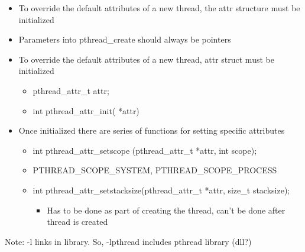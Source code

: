 \begin{itemize}
    \item To override the default attributes of a new thread, the attr structure must be initialized
    \item Parameters into pthread\_create should always be pointers
    \item To override the default attributes of a new thread, attr struct must be initialized
    \begin{itemize}
        \item pthread\_attr\_t attr;
        \item int pthread\_attr\_init( *attr)
    \end{itemize}
    \item Once initialized there are series of functions for setting specific attributes
    \begin{itemize}
        \item int pthread\_attr\_setscope (pthread\_attr\_t *attr, int scope);
        \item PTHREAD\_SCOPE\_SYSTEM, PTHREAD\_SCOPE\_PROCESS
        \item int pthread\_attr\_setstacksize(pthread\_attr\_t *attr, size\_t stacksize);
        \begin{itemize}
            \item Has to be done as part of creating the thread, can't be done after thread is created
        \end{itemize}
    \end{itemize}
\end{itemize}
Note: -l links in library. So, -lpthread includes pthread library (dll?)\vspace{0.15in}\\
